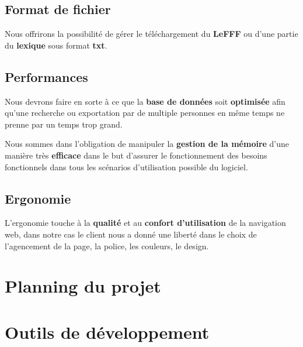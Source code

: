\documentclass[a4paper, 12pt]{article}
\begin{document}
\subsection{Format de fichier}
Nous offrirons la possibilité de gérer le téléchargement du \textbf{LeFFF} ou d'une partie du \textbf{lexique} sous format \textbf{txt}.

\subsection{Performances}

{Nous devrons faire en sorte à ce que la \textbf{base de données} soit \textbf{optimisée} afin qu'une recherche ou exportation par de multiple personnes en même temps ne prenne par un temps trop grand.\par}
Nous sommes dans l'obligation de manipuler la \textbf{gestion de la mémoire} d'une manière très \textbf{efficace} dans le but d'assurer le fonctionnement des besoins fonctionnels dans tous les scénarios d'utilisation possible du logiciel. 

\subsection{Ergonomie}
L’ergonomie touche à la \textbf{qualité} et au \textbf{confort d’utilisation} de la navigation web, dans notre cas le client nous a donné une liberté dans le choix de l'agencement de la page, la police, les couleurs, le design. 

\section{Planning du projet}

\section{Outils de développement}
\end{document}

